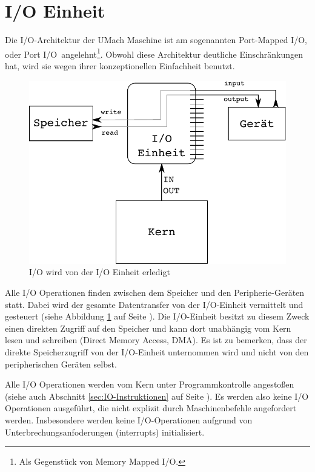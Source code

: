 \section{I/O Einheit}
\label{sec:IO-Einheit}

Die I/O-Architektur der UMach Maschine ist am sogenannten \glqq Port-Mapped
I/O\grqq, oder \glqq Port I/O\grqq\ angelehnt\footnote{Als Gegenstück von \glqq
Memory Mapped I/O\grqq.}. Obwohl diese Architektur deutliche Einschränkungen
hat, wird sie wegen ihrer konzeptionellen Einfachheit benutzt.

\begin{figure}[htp]
 \centering
 \includegraphics{./img/UMach-IO-Prozess.pdf}
 \caption{I/O wird von der I/O Einheit erledigt}
 \label{fig:UMach-IO-Prozess}
\end{figure}

Alle I/O Operationen finden zwischen dem Speicher und den Peripherie-Geräten
statt. Dabei wird der gesamte Datentransfer von der I/O-Einheit vermittelt und
gesteuert (siehe Abbildung \ref{fig:UMach-IO-Prozess} auf Seite
\pageref{fig:UMach-IO-Prozess}). Die I/O-Einheit besitzt zu diesem Zweck einen
direkten Zugriff auf den Speicher und kann dort unabhängig vom Kern lesen und
schreiben (Direct Memory Access, DMA). Es ist zu bemerken, dass
der direkte Speicherzugriff von der I/O-Einheit unternommen wird und nicht von
den peripherischen Geräten selbst.

Alle I/O Operationen werden vom Kern unter Programmkontrolle angestoßen (siehe
auch Abschnitt \ref{sec:IO-Instruktionen} auf Seite
\pageref{sec:IO-Instruktionen}). Es werden also keine I/O Operationen
ausgeführt, die nicht explizit durch Maschinenbefehle angefordert werden.
Insbesondere werden keine I/O-Operationen aufgrund von
Unterbrechungsanfoderungen (interrupts) initialisiert.

